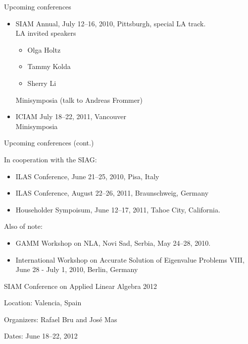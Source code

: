 \documentclass[]{seminar}
\begin{document}
{\begin{slide}
\end{slide}
\begin{slide}

\begin{center}
{\color{red}
Upcoming conferences
}
\end{center}
\vspace{4mm}

\begin{itemize}
\item
SIAM Annual, July 12--16,
2010, Pittsburgh, special LA track.
\\ LA invited speakers
\begin{itemize}
\item Olga Holtz
\item Tammy Kolda 
\item Sherry Li
\end{itemize}
Minisymposia (talk to Andreas Frommer)
\item ICIAM July 18--22, 2011, Vancouver
\\
Minisymposia
\end{itemize}

\end{slide}
\begin{slide}

\begin{center}
{\color{red}
Upcoming conferences (cont.)
}
\end{center}
\vspace{4mm}

{\color{blue} In cooperation with the SIAG:}
\begin{itemize}
\item
ILAS Conference, June 21--25, 2010, Pisa, Italy
\item
ILAS Conference, August 22--26, 2011, Braunschweig, 
Germany
\item
Householder Sympoisum, June 12--17, 2011, Tahoe City, California.
\end{itemize}

{\color{blue} Also of note:}
\begin{itemize}
\item
GAMM Workshop on NLA, Novi Sad, Serbia, May 24--28, 2010.
\item
International Workshop on Accurate Solution of Eigenvalue Problems VIII, 
June 28 - July 1, 2010, 
Berlin, Germany
\end{itemize}

\end{slide}
\begin{slide}

\begin{center}
{\color{red}
SIAM Conference on Applied Linear Algebra 2012
}
\end{center}

{\color{blue} Location:} Valencia, Spain

{\color{blue} Organizers:} Rafael Bru and Jos\'e Mas

{\color{blue} Dates:} June 18--22, 2012

\end{slide}

}
\end{document}
